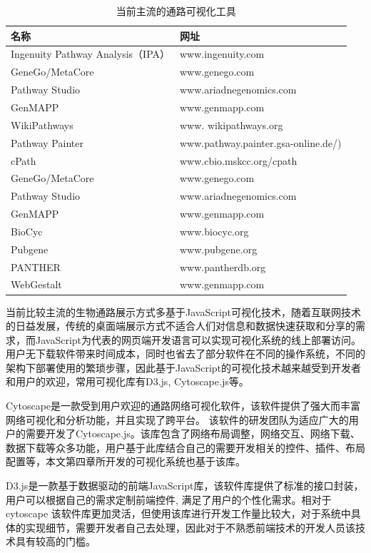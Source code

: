 \begin{table}[htbp]
  \centering
	\caption[table2]{当前主流的通路可视化工具}
\vspace{0.5em}\wuhao
\begin{tabularx}{1.0\textwidth}{lX}
\toprule[1.5pt]
名称 & 网址 \\
\midrule[1pt]
Ingenuity Pathway Analysis（IPA）	& www.ingenuity.com\\
GeneGo/MetaCore 	& www.genego.com\\
Pathway Studio 	& www.ariadnegenomics.com\\
GenMAPP	       & www.genmapp.com\\
WikiPathways & www. wikipathways.org\\
Pathway Painter	 & www.pathway.painter.gsa-online.de/)\\
cPath	& www.cbio.mskcc.org/cpath\\
GeneGo/MetaCore 	& www.genego.com\\
Pathway Studio 	& www.ariadnegenomics.com\\
GenMAPP	& www.genmapp.com\\
BioCyc	& www.biocyc.org\\
Pubgene	& www.pubgene.org\\
PANTHER	& www.pantherdb.org\\
WebGestalt	& www.genmapp.com\\

\bottomrule[1.5pt]
\end{tabularx}
\label{table2}
\end{table}

当前比较主流的生物通路展示方式多基于JavaScript可视化技术，随着互联网技术的日益发展，传统的桌面端展示方式不适合人们对信息和数据快速获取和分享的需求，而JavaScript为代表的网页端开发语言可以实现可视化系统的线上部署访问。用户无下载软件带来时间成本，同时也省去了部分软件在不同的操作系统，不同的架构下部署使用的繁琐步骤，因此基于JavaScript的可视化技术越来越受到开发者和用户的欢迎，常用可视化库有D3.js\cite{bostock2012d3}, Cytoscape.js\cite{franz2015cytoscape}等。


Cytoscape\cite{franz2015cytoscape}是一款受到用户欢迎的通路网络可视化软件，该软件提供了强大而丰富网络可视化和分析功能，并且实现了跨平台。 该软件的研发团队为适应广大的用户的需要开发了Cytoscape.js。该库包含了网络布局调整，网络交互、网络下载、数据下载等众多功能，用户基于此库结合自己的需要开发相关的控件、插件、布局配置等，本文第四章所开发的可视化系统也基于该库。


D3.js\cite{bostock2012d3}是一款基于数据驱动的前端JavaScript库，该软件库提供了标准的接口封装，用户可以根据自己的需求定制前端控件, 满足了用户的个性化需求。相对于cytoscape 该软件库更加灵活，但使用该库进行开发工作量比较大，对于系统中具体的实现细节，需要开发者自己去处理，因此对于不熟悉前端技术的开发人员该技术具有较高的门槛。

